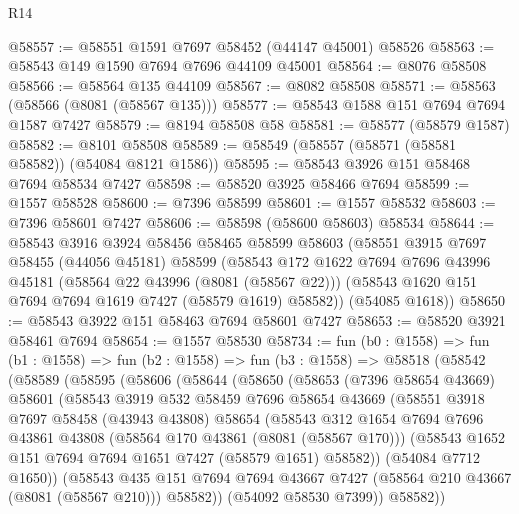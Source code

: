 \begin{lexlean}{R14}
\begin{coremodule}
@58557 := @58551 @1591 @7697 @58452 (@44147 @45001) @58526
@58563 := @58543 @149 @1590 @7694 @7696 @44109 @45001
@58564 := @8076 @58508
@58566 := @58564 @135 @44109
@58567 := @8082 @58508
@58571 := @58563 (@58566 (@8081 (@58567 @135)))
@58577 := @58543 @1588 @151 @7694 @7694 @1587 @7427
@58579 := @8194 @58508 @58
@58581 := @58577 (@58579 @1587)
@58582 := @8101 @58508
@58589 := @58549 (@58557 (@58571 (@58581 @58582)) (@54084 @8121 @1586))
@58595 := @58543 @3926 @151 @58468 @7694 @58534 @7427
@58598 := @58520 @3925 @58466 @7694
@58599 := @1557 @58528
@58600 := @7396 @58599
@58601 := @1557 @58532
@58603 := @7396 @58601 @7427
@58606 := @58598 (@58600 @58603) @58534
@58644 := @58543
    @3916
    @3924
    @58456
    @58465
    @58599
    @58603
    (@58551
      @3915
      @7697
      @58455
      (@44056 @45181)
      @58599
      (@58543
        @172
        @1622
        @7694
        @7696
        @43996
        @45181
        (@58564 @22 @43996 (@8081 (@58567 @22)))
        (@58543 @1620 @151 @7694 @7694 @1619 @7427 (@58579 @1619) @58582))
      (@54085 @1618))
@58650 := @58543 @3922 @151 @58463 @7694 @58601 @7427
@58653 := @58520 @3921 @58461 @7694
@58654 := @1557 @58530
@58734 := fun (b0 : @1558) =>
  fun (b1 : @1558) =>
  fun (b2 : @1558) =>
  fun (b3 : @1558) =>
  @58518
    (@58542
      (@58589
        (@58595
          (@58606
            (@58644
              (@58650
                (@58653
                  (@7396 @58654 @43669)
                  @58601
                  (@58543
                    @3919
                    @532
                    @58459
                    @7696
                    @58654
                    @43669
                    (@58551
                      @3918
                      @7697
                      @58458
                      (@43943 @43808)
                      @58654
                      (@58543
                        @312
                        @1654
                        @7694
                        @7696
                        @43861
                        @43808
                        (@58564 @170 @43861 (@8081 (@58567 @170)))
                        (@58543 @1652 @151 @7694 @7694 @1651 @7427 (@58579 @1651) @58582))
                      (@54084 @7712 @1650))
                    (@58543
                      @435
                      @151
                      @7694
                      @7694
                      @43667
                      @7427
                      (@58564 @210 @43667 (@8081 (@58567 @210)))
                      @58582))
                  (@54092 @58530 @7399))
                @58582))

\end{coremodule}
\end{lexlean}
